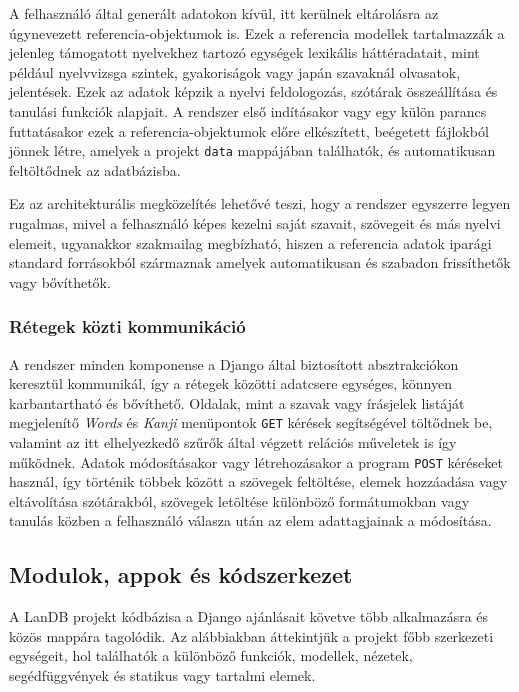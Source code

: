 A felhasználó által generált adatokon kívül, itt kerülnek eltárolásra az úgynevezett referencia-objektumok is. Ezek a referencia modellek tartalmazzák a jelenleg támogatott nyelvekhez tartozó egységek lexikális háttéradatait, mint például nyelvvizsga szintek, gyakoriságok vagy japán szavaknál olvasatok, jelentések. Ezek az adatok képzik a nyelvi feldologozás, szótárak összeállítása és tanulási funkciók alapjait. A rendszer első indításakor vagy egy külön parancs futtatásakor ezek a referencia-objektumok előre elkészített, beégetett fájlokból jönnek létre, amelyek a projekt \texttt{data} mappájában találhatók, és automatikusan feltöltődnek az adatbázisba.

Ez az architekturális megközelítés lehetővé teszi, hogy a rendszer egyszerre legyen rugalmas, mivel a felhasználó képes kezelni saját szavait, szövegeit és más nyelvi elemeit, ugyanakkor szakmailag megbízható, hiszen a referencia adatok iparági standard forrásokból származnak amelyek automatikusan és szabadon frissíthetők vagy bővíthetők.

\subsubsection{Rétegek közti kommunikáció}

A rendszer minden komponense a Django által biztosított absztrakciókon keresztül kommunikál, így a rétegek közötti adatcsere egységes, könnyen karbantartható és bővíthető. Oldalak, mint a szavak vagy írásjelek listáját megjelenítő \textit{Words} és \textit{Kanji} menüpontok \texttt{GET} kérések segítségével töltődnek be, valamint az itt elhelyezkedő szűrők által végzett relációs műveletek is így működnek. Adatok módosításakor vagy létrehozásakor a program \texttt{POST} kéréseket használ, így történik többek között a szövegek feltöltése, elemek hozzáadása vagy eltávolítása szótárakból, szövegek letöltése különböző formátumokban vagy tanulás közben a felhasználó válasza után az elem adattagjainak a módosítása.

\subsection{Modulok, appok és kódszerkezet}\label{moduls}

A LanDB projekt kódbázisa a Django ajánlásait követve több alkalmazásra és közös mappára tagolódik. Az alábbiakban áttekintjük a projekt főbb szerkezeti egységeit, hol találhatók a különböző funkciók, modellek, nézetek, segédfüggvények és statikus vagy tartalmi elemek.

